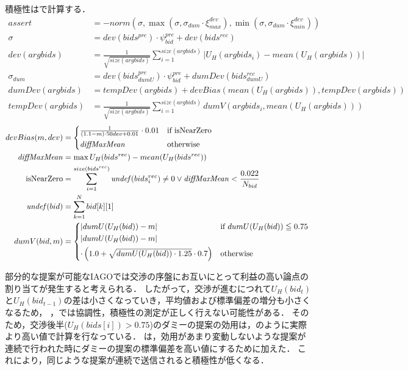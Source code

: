 積極性はで計算する．
\begin{align}
    assert &= -norm \left(\sigma, \max \left(\sigma, \sigma_{dum} \cdot \xi_{max}^{dev}\right), \min \left(\sigma, \sigma_{dum} \cdot \xi_{min}^{dev}\right) \right) \label{eq:assertiveness} \\
    \sigma &= dev(bids^{pre}) \cdot \psi_{\mathit{bid}}^{pre} + dev(bids^{rec}) \nonumber \\
    dev(argbids) &= \frac{1}{\sqrt{size(argbids)}}\sum_{i = 1}^{size(argbids)} |U_H(argbids_i) - mean(U_H(argbids))| \nonumber \\
    \sigma_{dum} &= dev(bids_{dumU}^{pre}) \cdot \psi_{\mathit{bid}}^{pre} + dumDev(bids_{dumU}^{rec}) \nonumber \\
    dumDev(argbids) &= tempDev(argbids) + devBias(mean(U_H(argbids)), tempDev(argbids)) \nonumber \\
    tempDev(argbids) &= \frac{1}{\sqrt{size(argbids)}}\sum_{i = 1}^{size(argbids)} dumV(argbids_i, mean(U_H(argbids))) \nonumber 
\end{align}
\begin{align}
    devBias(m, dev) &= 
    \begin{cases*}
        \frac{1}{(1.1 - m) \cdot 50dev + 0.01} \cdot 0.01 & if isNearZero \\
        \mathit{diffMaxMean} & otherwise 
    \end{cases*} \label{eq:devBias} \\
    \mathit{diffMaxMean} &= \max U_H(bids^{rec}) - mean(U_H(bids^{rec})) \nonumber \\
    {\rm isNearZero} &= \sum_{i = 1}^{size(bids^{rec})}\mathit{undef}(bids^{rec}_i) \neq 0 \vee \mathit{diffMaxMean} < \frac{0.022}{N_{bid}} \nonumber \\
    \mathit{undef}(bid) &= \sum_{k = 1}^{N} bid[k][1] \nonumber \\
    dumV(bid, m) &=
    \begin{cases*}
        |dumU(U_H(bid)) - m| & if $dumU(U_H(bid)) \leqq 0.75$ \\
        |dumU(U_H(bid)) - m| \\
        \cdot \left( 1.0 + \sqrt{dumU(U_H(bid)) \cdot 1.25} \cdot 0.7 \right) & otherwise 
    \end{cases*} \label{eq:dummyV}
\end{align}

部分的な提案が可能なIAGOでは交渉の序盤にお互いにとって利益の高い論点の割り当てが発生すると考えられる．
したがって，交渉が進むにつれて$U_H(bid_t)$と$U_H(bid_{t-1})$の差は小さくなっていき，平均値および標準偏差の増分も小さくなるため，
，では協調性，積極性の測定が正しく行えない可能性がある．
そのため，交渉後半($U_H(bids[i]) > 0.75$)のダミーの提案の効用は，のように実際より高い値で計算を行なっている．
は，効用があまり変動しないような提案が連続で行われた時にダミーの提案の標準偏差を高い値にするために加えた．
これにより，同じような提案が連続で送信されると積極性が低くなる．

